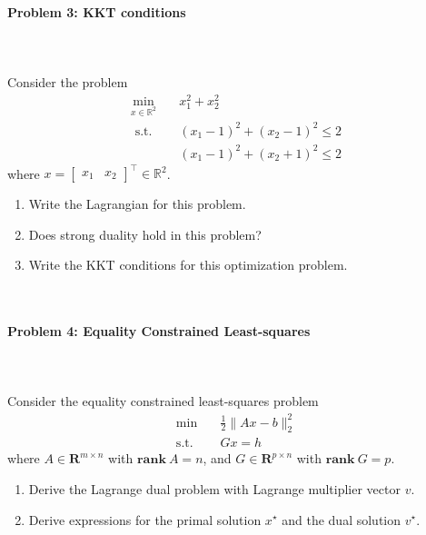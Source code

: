 \documentclass[a4paper]{article}
\newenvironment{solution}
{\color{blue} \paragraph{Solution.}}
{\newline \qed}
\begin{document}
\paragraph{Problem 3: KKT conditions}
~\\
~\\
Consider the problem
\begin{align*}
\min _{x \in \mathbb{R}^{2}} \quad &x_{1}^{2}+x_{2}^{2}\\
\text { s.t. } \quad & \left(x_{1}-1\right)^{2}+\left(x_{2}-1\right)^{2} \leq 2 \\
& \left(x_{1}-1\right)^{2}+\left(x_{2}+1\right)^{2} \leq 2
\end{align*}
where $x=\left[\begin{array}{ll}x_{1} & x_{2}\end{array}\right]^{\top} \in \mathbb{R}^{2}$. \\
\begin{enumerate}[(1)]
\item Write the Lagrangian for this problem.
\item Does strong duality hold in this problem?
\item Write the KKT conditions for this optimization problem.
\end{enumerate}
~\\


\paragraph{Problem 4: Equality Constrained Least-squares}
~\\
~\\
Consider the equality constrained least-squares problem
\begin{align*}
    \min \quad & \frac{1}{2}\|Ax-b\|_2^2\\
    \operatorname{s.t.} \quad & Gx=h~~
\end{align*}
where $A \in \mathbf{R}^{m\times n}$ with $\mathbf{rank}~A=n$, and $G\in\mathbf{R}^{p\times n}$ with $\mathbf{rank}~G=p$.
\begin{enumerate}[(1)]
    \item Derive the Lagrange dual problem with Lagrange multiplier vector $v$.
    \item Derive expressions for the primal solution $x^\star$ and the dual solution $v^\star$.
\end{enumerate}
~\\
\end{document}

